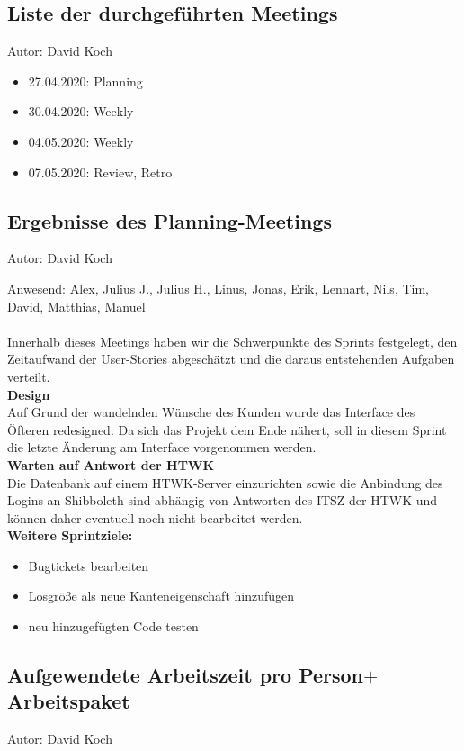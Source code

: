 \subsection{Liste der durchgeführten Meetings}
{\small Autor: David Koch}

\begin{itemize}
\item 27.04.2020: Planning
\item 30.04.2020: Weekly
\item 04.05.2020: Weekly
\item 07.05.2020: Review, Retro
\end{itemize}

\subsection{Ergebnisse des Planning-Meetings}
{\small Autor: David Koch}

Anwesend: Alex, Julius J., Julius H., Linus, Jonas, Erik, Lennart, Nils, Tim, David, Matthias, Manuel\\
\\
Innerhalb dieses Meetings haben wir die Schwerpunkte des Sprints festgelegt, den Zeitaufwand der User-Stories abgeschätzt und die daraus entstehenden Aufgaben verteilt.\\


\textbf{Design}\\
Auf Grund der wandelnden Wünsche des Kunden wurde das Interface des Öfteren redesigned. Da sich das Projekt dem Ende nähert, soll in diesem Sprint die letzte Änderung am Interface vorgenommen werden.\\

\textbf{Warten auf Antwort der HTWK}\\
Die Datenbank auf einem HTWK-Server einzurichten sowie die Anbindung des Logins an Shibboleth sind abhängig von Antworten des ITSZ der HTWK und können daher eventuell noch nicht bearbeitet werden.\\

\textbf{Weitere Sprintziele:}
\begin{itemize}
\item Bugtickets bearbeiten
\item Losgröße als neue Kanteneigenschaft hinzufügen
\item neu hinzugefügten Code testen
\end{itemize}


\subsection{Aufgewendete Arbeitszeit pro Person$+$Arbeitspaket}
{\small Autor: David Koch}


